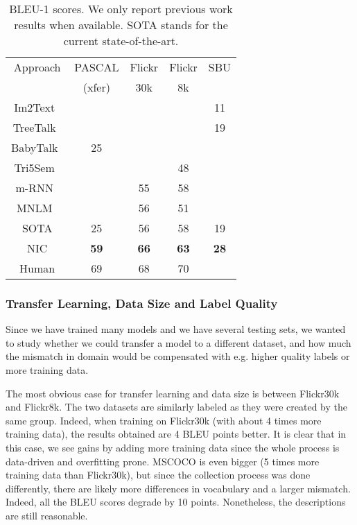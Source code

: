 \begin{table}
\centering
\begin{small}
\begin{tabular}{|c|c|c|c|c|}
 \hline
Approach & PASCAL & Flickr& Flickr& SBU  \\
         & (xfer) & 30k   & 8k    &      \\
\hline
\hline
Im2Text~\cite{ordonez2011im2text} &     &     &     & 11     \\
TreeTalk~\cite{kuznetsova2014treetalk} &     &     &     & 19     \\
BabyTalk~\cite{kulkarni2011baby} & 25  &     &     &        \\
Tri5Sem~\cite{hodosh2013framing} &     &     & 48  &        \\
m-RNN~\cite{baidu2014} &     & 55  & 58  &        \\
MNLM~\cite{kiros2014}\footnotemark &     & 56  & 51  &        \\
\hline
SOTA      & 25  & 56  & 58  & 19     \\
\hline
NIC   & \bf{59}  & \bf{66} & \bf{63}  & \bf{28}     \\
\hline
Human   & 69  & 68 & 70  &        \\
\hline
\end{tabular}
\end{small}
\caption{BLEU-1 scores. We only report previous work
results when available. SOTA stands for the current
state-of-the-art.}\label{tab:bleu}
\end{table}


\subsubsection{Transfer Learning, Data Size and Label Quality}

Since we have trained many models and we have several testing sets, we wanted to
study whether we could transfer a model to a different dataset, and how much the
mismatch in domain would be compensated with e.g. higher quality labels or more training
data.

The most obvious case for transfer learning and data size is between Flickr30k and Flickr8k. The two
datasets are similarly labeled as they were created by the same group.
Indeed, when training on Flickr30k (with about 4 times more training data),
the results obtained are 4 BLEU points better.
It is clear that in this case, we see gains by adding more training data
since the whole process is data-driven and overfitting prone.
MSCOCO is even bigger (5 times more
training data than Flickr30k), but since the collection process was done differently, there are likely
more differences in vocabulary and a larger mismatch. Indeed, all the BLEU scores degrade by 10 points.
Nonetheless, the descriptions are still reasonable.

